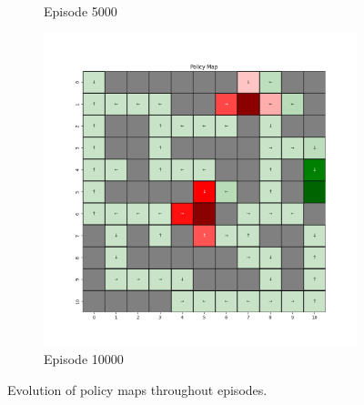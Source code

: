 \documentclass{assignment}
\begin{document}
\begin{figure}[H]
\begin{subfigure}{0.3\textwidth}
    \caption{Episode 5000}
    \end{subfigure}\hfill
    \begin{subfigure}{0.3\textwidth}
        \includegraphics[width=\textwidth]{figures/policy_td/gamma_sweep/policy_alpha_0.1_gamma_0.1_epsilon_0.2_iteration_10000.png}
    \caption{Episode 10000}
    \end{subfigure}
    \caption{Evolution of policy maps throughout episodes.}
    \label{fig:gamma_0.1_td_learning_policy}
\end{figure}
\end{document}
